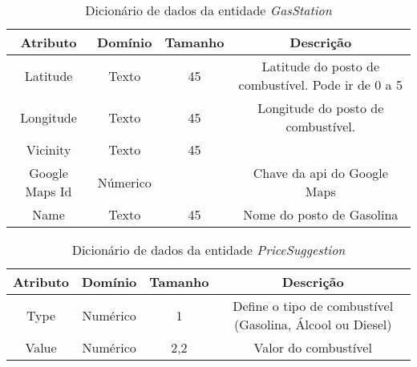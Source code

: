 \begin{table}[h]
\centering
\caption{Dicionário de dados da entidade \textit{GasStation}}
\label{my-label}
\begin{tabular}{cccc}
\toprule
\textbf{Atributo} & \textbf{Domínio} & \textbf{Tamanho} & \textbf{Descrição} \\
\midrule
Latitude                        & Texto                          & 45                             & Latitude do posto de combustível. Pode ir de 0 a 5                 \\
Longitude                       & Texto                          & 45                             & Longitude do posto de combustível.\\
Vicinity                        & Texto                          & 45                             &                                  \\
Google Maps Id                  & Númerico                       &                                & Chave da api do Google Maps      \\
Name                            & Texto                          & 45                             & Nome do posto de Gasolina\\
\bottomrule
\end{tabular}
\end{table}

\begin{table}[h]
\centering
\caption{Dicionário de dados da entidade \textit{PriceSuggestion}}
\label{dic:pricesuggestion}
\begin{tabular}{cccc}
\toprule
\textbf{Atributo} & \textbf{Domínio} & \textbf{Tamanho} & \textbf{Descrição} \\
\midrule
Type                            & Numérico                       &1                               & Define o tipo de combustível (Gasolina, Álcool ou Diesel)\\
Value                           & Numérico                       &2,2                             & Valor do combustível\\
\bottomrule
\end{tabular}
\end{table}


